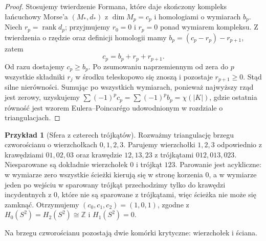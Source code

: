 \documentclass[11pt,a4paper]{report}
\numberwithin{equation}{section}
\theoremstyle{plain}
\theoremstyle{definition}
\newtheorem{przyklad}[twierdzenie]{Przykład}
\theoremstyle{remark}
\begin{document}
\begin{proof}
Stosujemy twierdzenie Formana, które daje skończony
kompleks łańcuchowy Morse'a $(M_*,d_*)$ z
$\dim M_p=c_p$ i homologiami o wymiarach $b_p$.
Niech $r_p=\operatorname{rank}d_p$; przyjmujemy
$r_0=0$ i $r_p=0$ ponad wymiarem kompleksu.
Z twierdzenia o rzędzie oraz definicji homologii mamy
$b_p=(c_p-r_p)-r_{p+1}$, zatem
\[
 c_p=b_p+r_p+r_{p+1}.
\]
Od razu dostajemy $c_p\ge b_p$.
Po zsumowaniu naprzemiennym od zera do $p$
wszystkie składniki $r_j$ w środku teleskopowo
się znoszą i pozostaje $r_{p+1}\ge0$. Stąd silne
nierówności. Sumując po wszystkich wymiarach,
ponieważ najwyższy rząd jest zerowy, uzyskujemy
$\sum(-1)^pc_p=\sum(-1)^pb_p=\chi(|K|)$,
gdzie ostatnia równość jest wzorem Eulera--Poincarégo
udowodnionym w rozdziale o triangulacjach.
\end{proof}

\begin{przyklad}[Sfera z czterech trójkątów]
Rozważmy triangulację brzegu czworościanu o wierzchołkach
$0,1,2,3$. Parujemy wierzchołki $1,2,3$
odpowiednio z krawędziami $01,02,03$ oraz krawędzie
$12,13,23$ z trójkątami $012,013,023$.
Niesparowane są dokładnie wierzchołek $0$ i trójkąt
$123$. Parowanie jest acykliczne: w wymiarze zero
wszystkie ścieżki kierują się w stronę korzenia $0$,
a w wymiarze jeden po wejściu w sparowany trójkąt
przechodzimy tylko do krawędzi incydentnych z $0$,
które nie są sparowane z trójkątami, więc ścieżka
nie może się zamknąć. Otrzymujemy
$(c_0,c_1,c_2)=(1,0,1)$, zgodne z
$H_0(S^2)=H_2(S^2)\cong\mathbb Z$ i $H_1(S^2)=0$.
\end{przyklad}

\begin{samepage}
\begin{center}
\begin{minipage}{.96\linewidth}\centering
{}\par\smallskip

{\footnotesize Na brzegu czworościanu pozostają dwie komórki
krytyczne: wierzchołek i ściana.}
\end{minipage}
\end{center}
\end{samepage}
\end{document}
